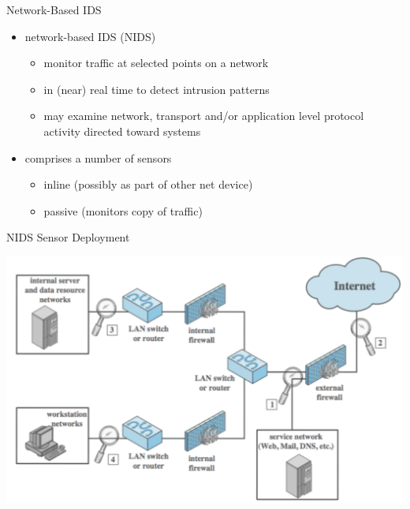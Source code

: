 \documentclass{beamer}
\begin{document}
\begin{frame}{Network-Based IDS}
  \begin{itemize}
  \item network-based IDS (NIDS) 
    \begin{itemize}
    \item monitor traffic at selected points on a network 
    \item in (near) real time to detect intrusion patterns 
    \item may examine network, transport and/or application 
      level protocol activity directed toward systems 
    \end{itemize}
  \item comprises a number of sensors 
    \begin{itemize}
    \item inline (possibly as part of other net device) 
    \item passive (monitors copy of traffic)
    \end{itemize}
  \end{itemize}
\end{frame}

\begin{frame}{NIDS Sensor Deployment}
   \begin{center}
    \includegraphics[width=0.9\linewidth]{nids}
  \end{center}
\end{frame}
\end{document}
